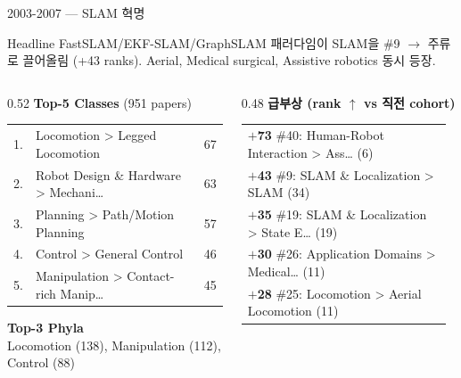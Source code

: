 \documentclass[aspectratio=169,t]{beamer}
\newcommand{\hot}[1]{\textcolor{accentorange}{\textbf{#1}}}
\newcommand{\muted}[1]{\textcolor{mutedgray}{#1}}
\begin{document}
\begin{frame}{2003-2007 \quad — \quad SLAM 혁명}
\small
\begin{block}{Headline}
FastSLAM/EKF-SLAM/GraphSLAM 패러다임이 SLAM을 \#9 $\to$ 주류로 끌어올림 (+43 ranks). Aerial, Medical surgical, Assistive robotics 동시 등장.
\end{block}
\vspace{4pt}

\begin{columns}[T,onlytextwidth]
\begin{column}{0.52\textwidth}
\textbf{Top-5 Classes} \muted{\scriptsize (951 papers)}\\[2pt]
\scriptsize
\begin{tabular}{@{}rlr@{}}
    1. & Locomotion > Legged Locomotion & 67 \\
    2. & Robot Design \& Hardware > Mechani… & 63 \\
    3. & Planning > Path/Motion Planning & 57 \\
    4. & Control > General Control & 46 \\
    5. & Manipulation > Contact-rich Manip… & 45 \\
\end{tabular}
\vspace{8pt}

\textbf{\small Top-3 Phyla}\\[2pt]
\scriptsize Locomotion (138), Manipulation (112), Control (88)
\end{column}

\begin{column}{0.48\textwidth}
\textbf{급부상 (rank $\uparrow$ vs 직전 cohort)}\\[2pt]
\scriptsize
\begin{tabular}{@{}p{0.95\linewidth}@{}}
    \hot{$+$73} \#40: Human-Robot Interaction > Ass… (6) \\
    \hot{$+$43} \#9: SLAM \& Localization > SLAM (34) \\
    \hot{$+$35} \#19: SLAM \& Localization > State E… (19) \\
    \hot{$+$30} \#26: Application Domains > Medical… (11) \\
    \hot{$+$28} \#25: Locomotion > Aerial Locomotion (11) \\
\end{tabular}
\end{column}
\end{columns}
\end{frame}
\end{document}
